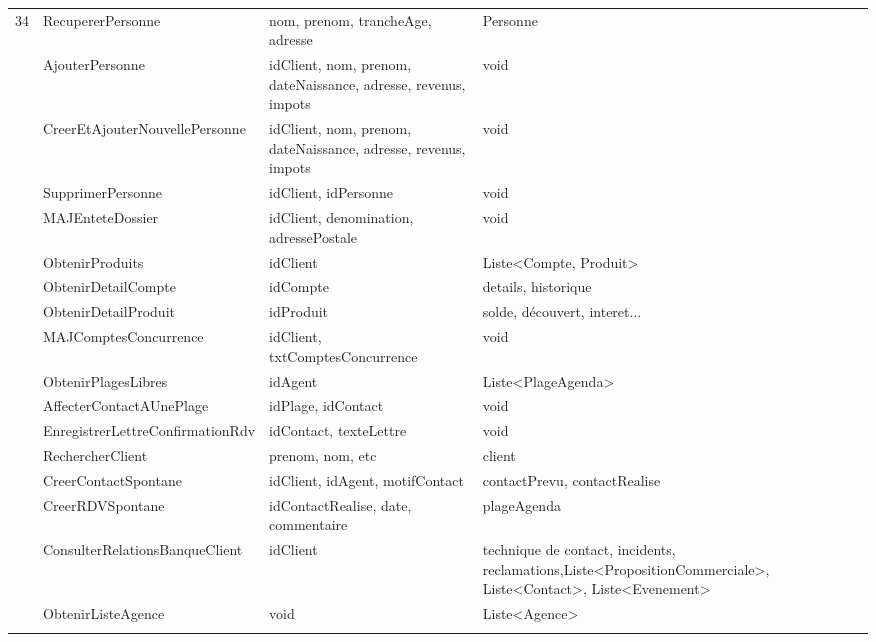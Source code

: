 \begin{table}[H]
{\begin{tabular}{P{0.8cm}P{5.5cm}P{6cm}P{6cm}}
			34 & RecupererPersonne & nom, prenom, trancheAge, adresse &  Personne \\  & AjouterPersonne & idClient, nom, prenom, dateNaissance, adresse, revenus, impots &  void \\  & CreerEtAjouterNouvellePersonne & idClient, nom, prenom, dateNaissance, adresse, revenus, impots &  void \\  & SupprimerPersonne & idClient, idPersonne &  void \\  & MAJEnteteDossier & idClient, denomination, adressePostale &  void \\  & ObtenirProduits & idClient &  Liste<Compte, Produit> \\  & ObtenirDetailCompte & idCompte &  details, historique \\  & ObtenirDetailProduit & idProduit &  solde, découvert, interet... \\  & MAJComptesConcurrence & idClient, txtComptesConcurrence &  void  \\  & ObtenirPlagesLibres & idAgent &  Liste<PlageAgenda> \\  & AffecterContactAUnePlage & idPlage, idContact &  void \\  & EnregistrerLettreConfirmationRdv & idContact, texteLettre &  void \\  & RechercherClient & prenom, nom, etc &  client \\  & CreerContactSpontane & idClient, idAgent, motifContact &  contactPrevu, contactRealise \\  & CreerRDVSpontane & idContactRealise, date, commentaire &  plageAgenda \\  & ConsulterRelationsBanqueClient & idClient &  technique de contact, incidents, reclamations,Liste<PropositionCommerciale>, Liste<Contact>, Liste<Evenement>  \\  & ObtenirListeAgence & void &  Liste<Agence> \\ \hline

\end{tabular}}
\end{table}
